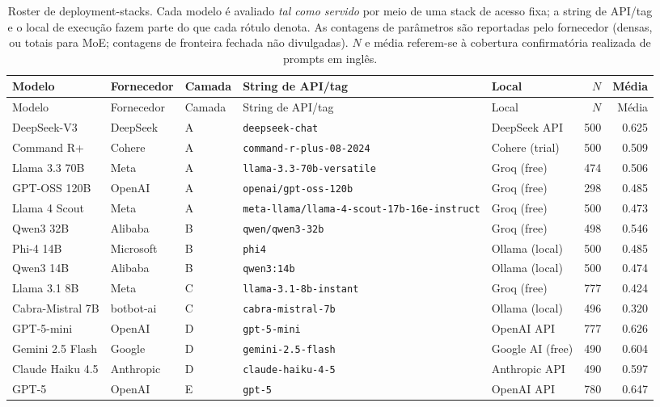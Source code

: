 \begin{longtable}{p{2.6cm}llp{4.4cm}lrr}
\caption{Roster de deployment-stacks. Cada modelo é avaliado \emph{tal como servido} por meio de uma stack de acesso fixa; a string de API/tag e o local de execução fazem parte do que cada rótulo denota. As contagens de parâmetros são reportadas pelo fornecedor (densas, ou totais para MoE; contagens de fronteira fechada não divulgadas). $N$ e média referem-se à cobertura confirmatória realizada de prompts em inglês.\label{tab:s-roster}}\\
\toprule
Modelo & Fornecedor & Camada & String de API/tag & Local & $N$ & Média \\
\midrule \endfirsthead
\toprule Modelo & Fornecedor & Camada & String de API/tag & Local & $N$ & Média \\ \midrule \endhead
DeepSeek-V3 & DeepSeek & A & \texttt{deepseek-chat} & DeepSeek API & 500 & 0.625 \\
Command R+ & Cohere & A & \texttt{command-r-plus-08-2024} & Cohere (trial) & 500 & 0.509 \\
Llama 3.3 70B & Meta & A & \texttt{llama-3.3-70b-versatile} & Groq (free) & 474 & 0.506 \\
GPT-OSS 120B & OpenAI & A & \texttt{openai/gpt-oss-120b} & Groq (free) & 298 & 0.485 \\
Llama 4 Scout & Meta & A & \texttt{meta-llama/llama-4-scout-17b-16e-instruct} & Groq (free) & 500 & 0.473 \\
Qwen3 32B & Alibaba & B & \texttt{qwen/qwen3-32b} & Groq (free) & 498 & 0.546 \\
Phi-4 14B & Microsoft & B & \texttt{phi4} & Ollama (local) & 500 & 0.485 \\
Qwen3 14B & Alibaba & B & \texttt{qwen3:14b} & Ollama (local) & 500 & 0.474 \\
Llama 3.1 8B & Meta & C & \texttt{llama-3.1-8b-instant} & Groq (free) & 777 & 0.424 \\
Cabra-Mistral 7B & botbot-ai & C & \texttt{cabra-mistral-7b} & Ollama (local) & 496 & 0.320 \\
GPT-5-mini & OpenAI & D & \texttt{gpt-5-mini} & OpenAI API & 777 & 0.626 \\
Gemini 2.5 Flash & Google & D & \texttt{gemini-2.5-flash} & Google AI (free) & 490 & 0.604 \\
Claude Haiku 4.5 & Anthropic & D & \texttt{claude-haiku-4-5} & Anthropic API & 490 & 0.597 \\
GPT-5 & OpenAI & E & \texttt{gpt-5} & OpenAI API & 780 & 0.647 \\
\bottomrule
\end{longtable}
